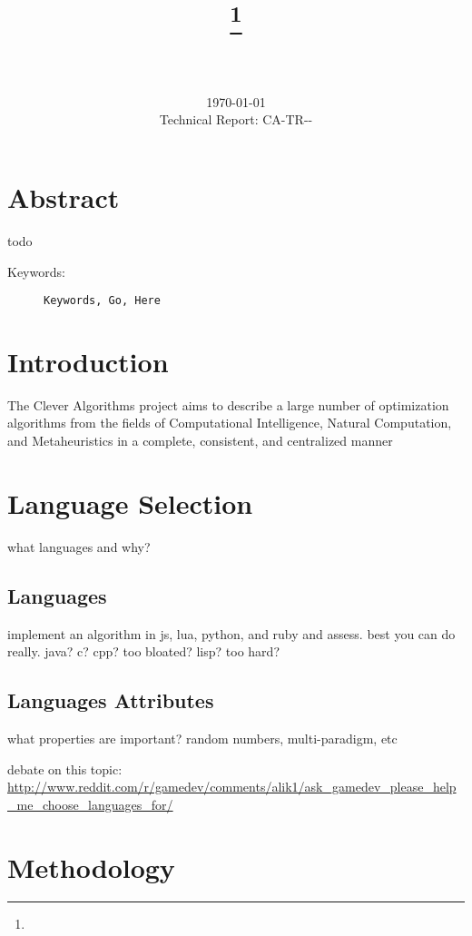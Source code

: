 \documentclass[a4paper, 11pt]{article}
\title{{\myreporttitle}\footnote{\myreportlicense}}
\author{\myreportauthor\\{\myreportemail}\\\small\myreportproject}
\date{\today\\{\small{Technical Report: CA-TR-{\myreportdate}-\myreportversion}}}
\begin{document}
\maketitle

\section*{Abstract} 
todo

\begin{description}
	\item[Keywords:] {\small\texttt{Keywords, Go, Here}}
\end{description} 

\section{Introduction}
\label{sec:introduction}
The Clever Algorithms project aims to describe a large number of optimization algorithms from the fields of Computational Intelligence, Natural Computation, and Metaheuristics in a complete, consistent, and centralized manner \cite{Brownlee2010}



% 
% 
\section{Language Selection}
\label{sec:language_selection}
what languages and why?

% 
%
\subsection{Languages}
implement an algorithm in js, lua, python, and ruby and assess. best you can do really.
java? c? cpp? too bloated?
lisp? too hard?


% 
%
\subsection{Languages Attributes}
what properties are important?
random numbers, multi-paradigm, etc


debate on this topic:
\url{http://www.reddit.com/r/gamedev/comments/alik1/ask_gamedev_please_help_me_choose_languages_for/}


% 
%
\section{Methodology}
\label{sec:methodology}
\end{document}
